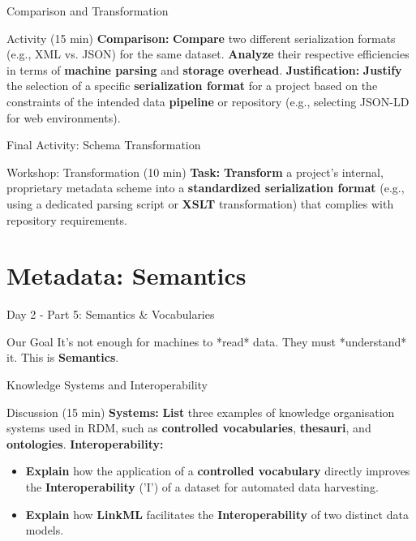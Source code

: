 \documentclass{integrity} %
\begin{document}
\begin{frame}{Comparison and Transformation}
    \begin{block}{Activity (15 min)}
        \textbf{Comparison:} \textbf{Compare} two different serialization formats (e.g., XML vs. JSON) for the same dataset. \textbf{Analyze} their respective efficiencies in terms of \textbf{machine parsing} and \textbf{storage overhead}.
        \pause
        \textbf{Justification:} \textbf{Justify} the selection of a specific \textbf{serialization format} for a project based on the constraints of the intended data \textbf{pipeline} or repository (e.g., selecting JSON-LD for web environments).
    \end{block}
\end{frame}

\begin{frame}{Final Activity: Schema Transformation}
    \begin{block}{Workshop: Transformation (10 min)}
        \textbf{Task:} \textbf{Transform} a project's internal, proprietary metadata scheme into a \textbf{standardized serialization format} (e.g., using a dedicated parsing script or \textbf{XSLT} transformation) that complies with repository requirements.
    \end{block}
\end{frame}

\section{Metadata: Semantics}

\begin{frame}{Day 2 - Part 5: Semantics \& Vocabularies}
    \begin{block}{Our Goal}
        It's not enough for machines to *read* data. They must *understand* it. This is \textbf{Semantics}.
    \end{block}
\end{frame}

\begin{frame}{Knowledge Systems and Interoperability}
    \begin{block}{Discussion (15 min)}
        \textbf{Systems:} \textbf{List} three examples of knowledge organisation systems used in RDM, such as \textbf{controlled vocabularies}, \textbf{thesauri}, and \textbf{ontologies}.
        \pause
        \textbf{Interoperability:}
        \begin{itemize}
            \item \textbf{Explain} how the application of a \textbf{controlled vocabulary} directly improves the \textbf{Interoperability} ('I') of a dataset for automated data harvesting.
            \item \textbf{Explain} how \textbf{LinkML} facilitates the \textbf{Interoperability} of two distinct data models.
        \end{itemize}
    \end{block}
\end{frame}
\end{document}
